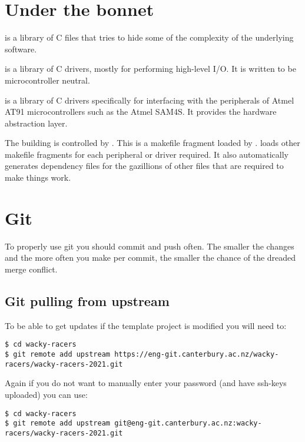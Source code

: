 \section{Under the bonnet}
\label{under-the-bonnet}

 is a library of C files that tries to hide some of the
complexity of the underlying software.

 is a library of C drivers, mostly for performing high-level I/O.
It is written to be microcontroller neutral.

 is a library of C drivers specifically for interfacing
with the peripherals of Atmel AT91 microcontrollers such as the Atmel
SAM4S. It provides the hardware abstraction layer.

The building is controlled by . This is a
makefile fragment loaded by .
 loads other makefile fragments for each
peripheral or driver required. It also automatically generates
dependency files for the gazillions of other files that are required to
make things work.

\section{Git}
\label{git}

To properly use git you should commit and push often. The smaller the
changes and the more often you make per commit, the smaller the chance
of the dreaded merge conflict.

\subsection{Git pulling from upstream}
\label{git-pulling-from-upstream}

To be able to get updates if the template project is modified you will
need to:

\begin{verbatim}
$ cd wacky-racers 
$ git remote add upstream https://eng-git.canterbury.ac.nz/wacky-racers/wacky-racers-2021.git  
\end{verbatim}

Again if you do not want to manually enter your password (and have
ssh-keys uploaded) you can use:
%
\begin{verbatim}
$ cd wacky-racers 
$ git remote add upstream git@eng-git.canterbury.ac.nz:wacky-racers/wacky-racers-2021.git
\end{verbatim}

